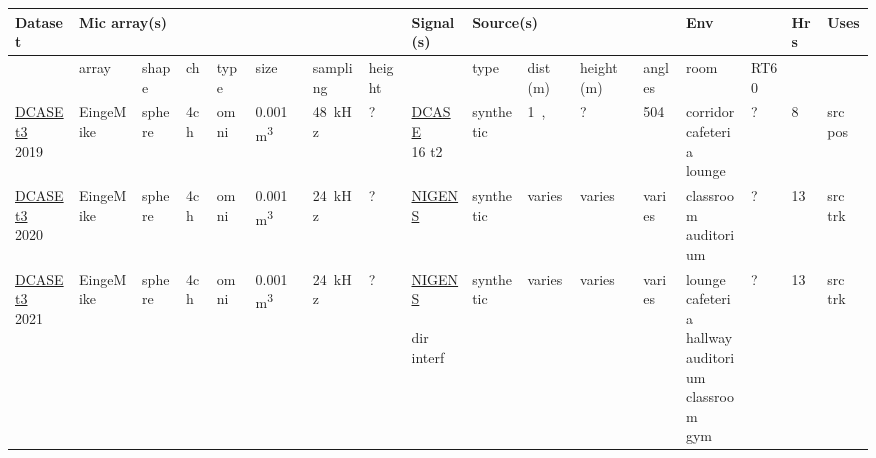 \documentclass[14pt, legalpaper]{extarticle}
\begin{document}
\begin{landscape}
{\footnotesize
\begin{longtable}{|*{17}{l|}}
Dataset & \multicolumn{7}{l|}{Mic array(s)} & Signal(s) & \multicolumn{4}{l|}{Source(s)} & \multicolumn{2}{l|}{Env} & Hrs & Uses \\
\hline
& array & shape & ch & type & size & sampling & height & & type & dist (m) & height (m) & angles & room & RT60 & & \\

\hline
\makecell[tl]{\href{https://zenodo.org/record/2599196}{DCASE t3} \\
2019 \\ \cite{adavanne2019multi}} &
EingeMike & sphere & 4ch & omni & \SI{0.001}{\cubic\metre} & \SI{48}{\kilo\hertz} & ? &
\makecell[tl]{\href{http://dcase.community/challenge2016/task-sound-event-detection-in-synthetic-audio}{DCASE} \\ 16 t2} & 
synthetic & \SI{1},\SI{2} & ? & 504 &
\makecell[tl]{corridor \\ cafeteria \\ lounge} & ? &
8 &
src pos \cite{kapka2019sound} \\

\hline
\makecell[tl]{\href{https://zenodo.org/record/4064792}{DCASE t3} \\
2020 \\ \cite{politis2020dataset}} &
EingeMike & sphere & 4ch & omni & \SI{0.001}{\cubic\metre} & \SI{24}{\kilo\hertz} & ? &
\makecell[tl]{\href{https://zenodo.org/record/2535878}{NIGENS} \\ \cite{trowitzsch2019nigens}} & 
synthetic & varies & varies & varies &
\makecell[tl]{classroom \\ auditorium} & ? &
13 &
src trk \cite{shimada2020sound, wang2020ustc, nguyen2020dcase} \\

\hline
\makecell[tl]{\href{https://zenodo.org/record/4568781}{DCASE t3} \\
2021 \\ \cite{politis2021tau}} &
EingeMike & sphere & 4ch & omni & \SI{0.001}{\cubic\metre} & \SI{24}{\kilo\hertz} & ? &
\makecell[tl]{\href{https://zenodo.org/record/2535878}{NIGENS} \\ \cite{trowitzsch2019nigens} \\ dir interf} & 
synthetic & varies & varies & varies &
\makecell[tl]{lounge \\ cafeteria \\ hallway \\ auditorium \\ classroom \\ gym} & ? &
13 &
src trk \cite{shimada2020sound, wang2020ustc, nguyen2020dcase} \\


\end{longtable}}
\end{landscape}
\end{document}
